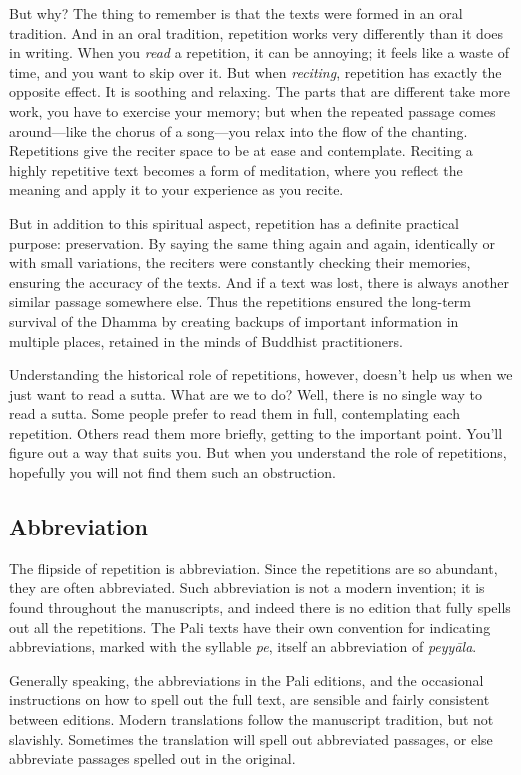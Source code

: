 \documentclass[12pt,openany]{book}%
\begin{document}
But why? The thing to remember is that the texts were formed in an oral tradition. And in an oral tradition, repetition works very differently than it does in writing. When you \emph{read} a repetition, it can be annoying; it feels like a waste of time, and you want to skip over it. But when \emph{reciting}, repetition has exactly the opposite effect. It is soothing and relaxing. The parts that are different take more work, you have to exercise your memory; but when the repeated passage comes around—like the chorus of a song—you relax into the flow of the chanting. Repetitions give the reciter space to be at ease and contemplate. Reciting a highly repetitive text becomes a form of meditation, where you reflect the meaning and apply it to your experience as you recite.

But in addition to this spiritual aspect, repetition has a definite practical purpose: preservation. By saying the same thing again and again, identically or with small variations, the reciters were constantly checking their memories, ensuring the accuracy of the texts. And if a text was lost, there is always another similar passage somewhere else. Thus the repetitions ensured the long-term survival of the Dhamma by creating backups of important information in multiple places, retained in the minds of Buddhist practitioners.

Understanding the historical role of repetitions, however, doesn’t help us when we just want to read a sutta. What are we to do? Well, there is no single way to read a sutta. Some people prefer to read them in full, contemplating each repetition. Others read them more briefly, getting to the important point. You’ll figure out a way that suits you. But when you understand the role of repetitions, hopefully you will not find them such an obstruction.

\subsection*{Abbreviation}

The flipside of repetition is abbreviation. Since the repetitions are so abundant, they are often abbreviated. Such abbreviation is not a modern invention; it is found throughout the manuscripts, and indeed there is no edition that fully spells out all the repetitions. The Pali texts have their own convention for indicating abbreviations, marked with the syllable \textit{pe}, itself an abbreviation of \textit{\textsanskrit{peyyāla}}.

Generally speaking, the abbreviations in the Pali editions, and the occasional instructions on how to spell out the full text, are sensible and fairly consistent between editions. Modern translations follow the manuscript tradition, but not slavishly. Sometimes the translation will spell out abbreviated passages, or else abbreviate passages spelled out in the original.
\end{document}
